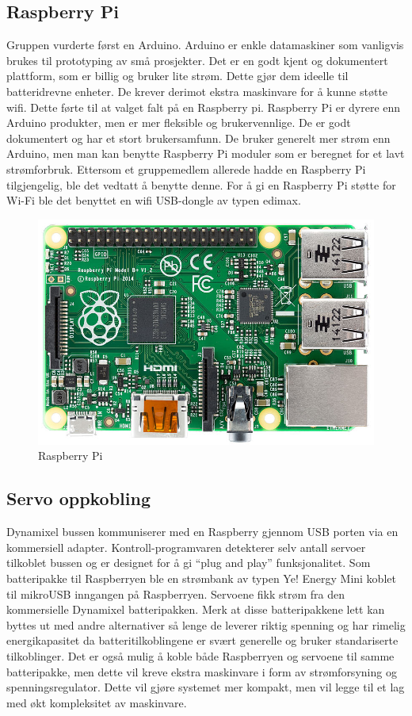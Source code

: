 \documentclass[12pt]{report}
\begin{document}
\subsection{Raspberry Pi}
Gruppen vurderte først en Arduino\cite{Arduino}. Arduino er enkle datamaskiner som vanligvis brukes til prototyping av små prosjekter. Det er en godt kjent og dokumentert plattform, som er billig og bruker lite strøm. Dette gjør dem ideelle til batteridrevne enheter. De krever derimot ekstra maskinvare for å kunne støtte wifi. Dette førte til at valget falt på en Raspberry pi. Raspberry Pi er dyrere enn Arduino produkter, men er mer fleksible og brukervennlige. De er godt dokumentert og har et stort brukersamfunn. De bruker generelt mer strøm enn Arduino, men man kan benytte Raspberry Pi moduler som er beregnet for et lavt strømforbruk\cite{RaspberryApluss}. Ettersom et gruppemedlem allerede hadde en Raspberry Pi tilgjengelig, ble det vedtatt å benytte denne. For å gi en Raspberry Pi støtte for Wi-Fi ble det benyttet en wifi USB-dongle av typen edimax\cite{dongle}.

\begin{figure}[H]
	\includegraphics[scale=0.47]{imgs/RaspberryPi}
	\centering
	\caption{Raspberry Pi}
	\label{Rasp}
\end{figure}

\subsection{Servo oppkobling}
Dynamixel bussen kommuniserer med en Raspberry gjennom USB porten via en kommersiell adapter\cite{USBadapter}. Kontroll-programvaren detekterer selv antall servoer tilkoblet bussen og er designet for å gi “plug and play” funksjonalitet. Som batteripakke til Raspberryen ble en strømbank av typen Ye! Energy Mini\cite{Energybank} koblet til mikroUSB inngangen på Raspberryen. Servoene fikk strøm fra den kommersielle Dynamixel batteripakken. Merk at disse batteripakkene lett kan byttes ut med andre alternativer så lenge de leverer riktig spenning og har rimelig energikapasitet da batteritilkoblingene er svært generelle og bruker standariserte tilkoblinger. Det er også mulig å koble både Raspberryen og servoene til samme batteripakke, men dette vil kreve ekstra maskinvare i form av strømforsyning og spenningsregulator. Dette vil gjøre systemet mer kompakt, men vil legge til et lag med økt kompleksitet av maskinvare.
\end{document}
